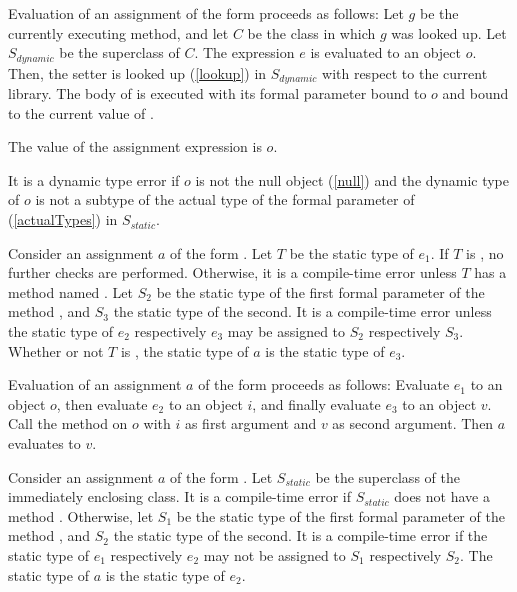 \documentclass[makeidx]{article}
\begin{document}
{\LMHash{}%
Evaluation of an assignment of the form 
proceeds as follows:
Let $g$ be the currently executing method, and let $C$ be
the class in which $g$ was looked up.
Let $S_{dynamic}$ be the superclass of $C$.
The expression $e$ is evaluated to an object $o$.
Then, the setter  is looked up (\ref{lookup})
in $S_{dynamic}$ with respect to the current library.
The body of  is executed with its formal parameter bound to $o$
and \THIS{} bound to the current value of \THIS.


\LMHash{}%
The value of the assignment expression is $o$.

\LMHash{}%
It is a dynamic type error if $o$ is not the null object (\ref{null})
and the dynamic type of $o$ is
not a subtype of the actual type of the formal parameter of 
(\ref{actualTypes}) in $S_{static}$.
\EndCase

\LMHash{}%
Consider an assignment $a$ of the form .
Let $T$ be the static type of $e_1$.
If $T$ is \DYNAMIC, no further checks are performed.
Otherwise, it is a compile-time error unless
$T$ has a method named \code{[]=}.
Let $S_2$ be the static type of the
first formal parameter of the method \code{[]=},
and $S_3$ the static type of the second.
It is a compile-time error unless the static type of $e_2$ respectively $e_3$
may be assigned to $S_2$ respectively $S_3$.
Whether or not $T$ is \DYNAMIC,
the static type of $a$ is the static type of $e_3$.

\LMHash{}%
Evaluation of an assignment $a$ of the form 
proceeds as follows:
Evaluate $e_1$ to an object $o$,
then evaluate $e_2$ to an object $i$,
and finally evaluate $e_3$ to an object $v$.
Call the method \code{[]=} on $o$
with $i$ as first argument and $v$ as second argument.
Then $a$ evaluates to $v$.
\EndCase

\LMHash{}%
Consider an assignment $a$ of the form .
Let $S_{static}$ be the superclass of the immediately enclosing class.
It is a compile-time error if $S_{static}$ does not have a method \code{[]=}.
Otherwise, let $S_1$ be the static type of the
first formal parameter of the method \code{[]=},
and $S_2$ the static type of the second.
It is a compile-time error if the static type of $e_1$ respectively $e_2$
may not be assigned to $S_1$ respectively $S_2$.
The static type of $a$ is the static type of $e_2$.

}
\end{document}
